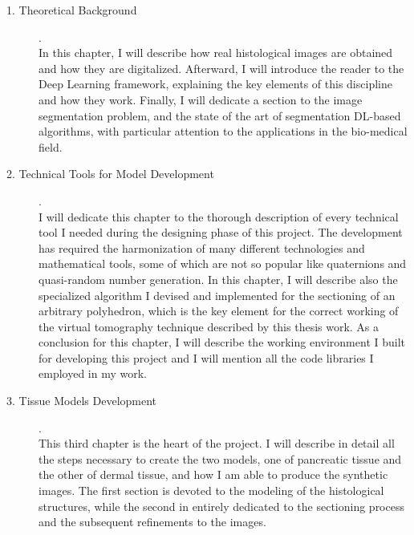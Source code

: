 \begin{description}
    \item [1. Theoretical Background]. \hfill \\
    In this chapter, I will describe how real histological images are obtained and how they are digitalized. Afterward, I will introduce the reader to the Deep Learning framework, explaining the key elements of this discipline and how they work. Finally, I will dedicate a section to the image segmentation problem, and the state of the art of segmentation DL-based algorithms, with particular attention to the applications in the bio-medical field.

    \item [2. Technical Tools for Model Development]. \hfill \\
    I will dedicate this chapter to the thorough description of every technical tool I needed during the designing phase of this project. The development has required the harmonization of many different technologies and mathematical tools, some of which are not so popular like quaternions and quasi-random number generation. In this chapter, I will describe also the specialized algorithm I devised and implemented for the sectioning of an arbitrary polyhedron, which is the key element for the correct working of the virtual tomography technique described by this thesis work. As a conclusion for this chapter, I will describe the working environment I built for developing this project and I will mention all the code libraries I employed in my work.

    \item [3. Tissue Models Development]. \hfill \\
    This third chapter is the heart of the project. I will describe in detail all the steps necessary to create the two models, one of pancreatic tissue and the other of dermal tissue, and how I am able to produce the synthetic images. The first section is devoted to the modeling of the histological structures, while the second in entirely dedicated to the sectioning process and the subsequent refinements to the images.
\end{description}
